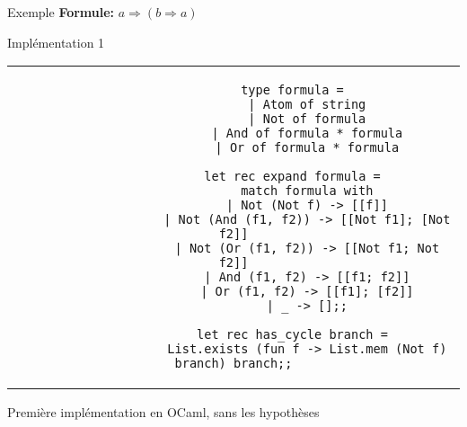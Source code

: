 \documentclass[]{beamer}
\begin{document}
\begin{frame}{Exemple}
    \textbf{Formule:} $a \Rightarrow (b \Rightarrow a)$

    \begin{center}
    \end{center}
\end{frame}

\begin{frame}[fragile]{Implémentation 1}
    \begin{center}
        \begin{tabular}{c}
            \begin{lstlisting}
                type formula =
                    | Atom of string
                    | Not of formula
                    | And of formula * formula
                    | Or of formula * formula

                let rec expand formula =
                    match formula with
                    | Not (Not f) -> [[f]]
                    | Not (And (f1, f2)) -> [[Not f1]; [Not f2]]
                    | Not (Or (f1, f2)) -> [[Not f1; Not f2]]
                    | And (f1, f2) -> [[f1; f2]]
                    | Or (f1, f2) -> [[f1]; [f2]]
                    | _ -> [];;

                let rec has_cycle branch =
                    List.exists (fun f -> List.mem (Not f) branch) branch;;
            \end{lstlisting}
        \end{tabular}

    Première implémentation en OCaml, sans les hypothèses
      \end{center}
\end{frame}
\end{document}
